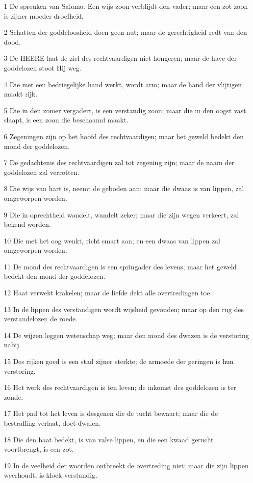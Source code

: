 \par 1 De spreuken van Salomo. Een wijs zoon verblijdt den vader; maar een zot zoon is zijner moeder droefheid.
\par 2 Schatten der goddeloosheid doen geen nut; maar de gerechtigheid redt van den dood.
\par 3 De HEERE laat de ziel des rechtvaardigen niet hongeren; maar de have der goddelozen stoot Hij weg.
\par 4 Die met een bedriegelijke hand werkt, wordt arm; maar de hand der vlijtigen maakt rijk.
\par 5 Die in den zomer vergadert, is een verstandig zoon; maar die in den oogst vast slaapt, is een zoon die beschaamd maakt.
\par 6 Zegeningen zijn op het hoofd des rechtvaardigen; maar het geweld bedekt den mond der goddelozen.
\par 7 De gedachtenis des rechtvaardigen zal tot zegening zijn; maar de naam der goddelozen zal verrotten.
\par 8 Die wijs van hart is, neemt de geboden aan; maar die dwaas is van lippen, zal omgeworpen worden.
\par 9 Die in oprechtheid wandelt, wandelt zeker; maar die zijn wegen verkeert, zal bekend worden.
\par 10 Die met het oog wenkt, richt smart aan; en een dwaas van lippen zal omgeworpen worden.
\par 11 De mond des rechtvaardigen is een springader des levens; maar het geweld bedekt den mond der goddelozen.
\par 12 Haat verwekt krakelen; maar de liefde dekt alle overtredingen toe.
\par 13 In de lippen des verstandigen wordt wijsheid gevonden; maar op den rug des verstandelozen de roede.
\par 14 De wijzen leggen wetenschap weg; maar den mond des dwazen is de verstoring nabij.
\par 15 Des rijken goed is een stad zijner sterkte; de armoede der geringen is hun verstoring.
\par 16 Het werk des rechtvaardigen is ten leven; de inkomst des goddelozen is ter zonde.
\par 17 Het pad tot het leven is desgenen die de tucht bewaart; maar die de bestraffing verlaat, doet dwalen.
\par 18 Die den haat bedekt, is van valse lippen, en die een kwaad gerucht voortbrengt, is een zot.
\par 19 In de veelheid der woorden ontbreekt de overtreding niet; maar die zijn lippen weerhoudt, is kloek verstandig.
